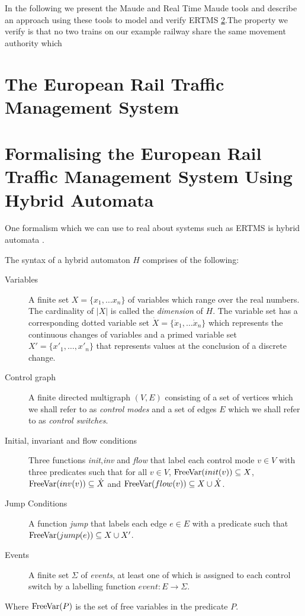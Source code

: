 \newcommand{\rtmaude}{Real Time Maude}

In the following we present the Maude \cite{MC03,Maude} and Real Time Maude \cite{PO02,PO04,RTMaude} tools and describe an approach using these tools to model and verify ERTMS \ref{}.The property we verify is that no two trains on our example railway share the same movement authority which 


\section{The European Rail Traffic Management System}

\section{Formalising the European Rail Traffic Management System Using Hybrid Automata}
One formalism which we can use to real about systems such as ERTMS is hybrid automata \cite{TH96}.

\begin{mydef}
The syntax of a hybrid automaton $H$ comprises of the following:
\begin{description}
\item[Variables] A finite set $X = \{x_1, \ldots x_n \}$ of variables which range over the real numbers. The cardinality of $|X|$ is called the \emph{dimension} of $H$. The variable set has a corresponding dotted variable set $\dot{X} = \{\dot{x}_1, \ldots \dot{x}_n \}$ which represents the continuous changes of variables and a primed variable set $X' = \{x'_1, \ldots , x'_n \}$ that represents  values at the conclusion of a discrete change.

\item[Control graph] A finite directed multigraph $(V,E)$ consisting of a set of vertices which we shall refer to as \emph{control modes} and a set of edges $E$ which we shall refer to as \emph{control switches}.

\item[Initial, invariant and flow conditions] Three functions \emph{init},\emph{inv} and \emph{flow} that label each control mode $v \in V$ with three predicates such that for all $v \in V$, $\mathrm{FreeVar}(init(v)) \subseteq X$, $\mathrm{FreeVar}(inv(v)) \subseteq \dot{X}$ and $\mathrm{FreeVar}(flow(v)) \subseteq X \cup \dot{X}$. 

\item[Jump Conditions] A function \emph{jump} that labels each edge $e \in E$ with a predicate such that $\mathrm{FreeVar}(jump(e)) \subseteq X \cup X' $.

\item[Events] A finite set $\Sigma$ of \emph{events}, at least one of which is assigned to  each control switch by a labelling function $event: E \to \Sigma$.

\end{description}
Where $\mathrm{FreeVar}(P)$ is the set of free variables in the predicate $P$.
\end{mydef}

